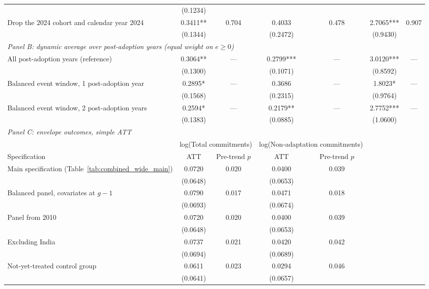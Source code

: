 \begin{table}[H]
{\begin{tabular}{lcccccc}
 & (0.1234) &  &  &  &  &  \\
Drop the 2024 cohort and calendar year 2024 & 0.3411** & 0.704 & 0.4033 & 0.478 & 2.7065*** & 0.907 \\
 & (0.1344) &  & (0.2472) &  & (0.9430) &  \\
\midrule
\multicolumn{7}{l}{\textit{Panel B: dynamic average over post-adoption years (equal weight on $e \geq 0$)}} \\
All post-adoption years (reference) & 0.3064** & --- & 0.2799*** & --- & 3.0120*** & --- \\
 & (0.1300) &  & (0.1071) &  & (0.8592) &  \\
Balanced event window, 1 post-adoption year & 0.2895* & --- & 0.3686 & --- & 1.8023* & --- \\
 & (0.1568) &  & (0.2315) &  & (0.9764) &  \\
Balanced event window, 2 post-adoption years & 0.2594* & --- & 0.2179** & --- & 2.7752*** & --- \\
 & (0.1383) &  & (0.0885) &  & (1.0600) &  \\
\midrule
\multicolumn{7}{l}{\textit{Panel C: envelope outcomes, simple ATT}} \\
 & \multicolumn{2}{c}{log(Total commitments)} & \multicolumn{2}{c}{log(Non-adaptation commitments)} & & \\
\cmidrule(lr){2-3} \cmidrule(lr){4-5}
Specification & ATT & Pre-trend $p$ & ATT & Pre-trend $p$ & & \\
\midrule
Main specification (Table~\ref{tab:combined_wide_main}) & 0.0720 & 0.020 & 0.0400 & 0.039 &  &  \\
 & (0.0648) &  & (0.0653) &  &  &  \\
Balanced panel, covariates at $g-1$ & 0.0790 & 0.017 & 0.0471 & 0.018 &  &  \\
 & (0.0693) &  & (0.0674) &  &  &  \\
Panel from 2010 & 0.0720 & 0.020 & 0.0400 & 0.039 &  &  \\
 & (0.0648) &  & (0.0653) &  &  &  \\
Excluding India & 0.0737 & 0.021 & 0.0420 & 0.042 &  &  \\
 & (0.0694) &  & (0.0689) &  &  &  \\
Not-yet-treated control group & 0.0611 & 0.023 & 0.0294 & 0.046 &  &  \\
 & (0.0641) &  & (0.0657) &  &  &  \\
\bottomrule
\end{tabular}
}
\par\vspace{4pt}

\end{table}
